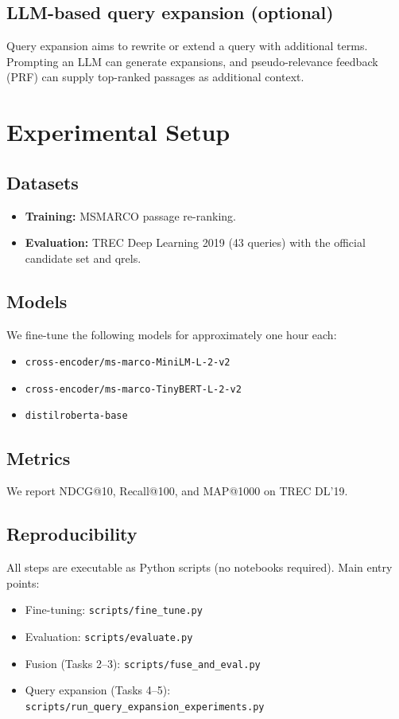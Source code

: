 \documentclass[11pt]{article}
\begin{document}
\subsection{LLM-based query expansion (optional)}
Query expansion aims to rewrite or extend a query with additional terms. Prompting an LLM can generate expansions, and pseudo-relevance feedback (PRF) can supply top-ranked passages as additional context.

\section{Experimental Setup}
\subsection{Datasets}
\begin{itemize}[leftmargin=*]
  \item \textbf{Training:} MSMARCO passage re-ranking.
  \item \textbf{Evaluation:} TREC Deep Learning 2019 (43 queries) with the official candidate set and qrels.
\end{itemize}

\subsection{Models}
We fine-tune the following models for approximately one hour each:
\begin{itemize}[leftmargin=*]
  \item \texttt{cross-encoder/ms-marco-MiniLM-L-2-v2}
  \item \texttt{cross-encoder/ms-marco-TinyBERT-L-2-v2}
  \item \texttt{distilroberta-base}
\end{itemize}

\subsection{Metrics}
We report NDCG@10, Recall@100, and MAP@1000 on TREC DL'19.

\subsection{Reproducibility}
All steps are executable as Python scripts (no notebooks required). Main entry points:
\begin{itemize}[leftmargin=*]
  \item Fine-tuning: \texttt{scripts/fine\_tune.py}
  \item Evaluation: \texttt{scripts/evaluate.py}
  \item Fusion (Tasks 2--3): \texttt{scripts/fuse\_and\_eval.py}
  \item Query expansion (Tasks 4--5): \texttt{scripts/run\_query\_expansion\_experiments.py}
\end{itemize}
\end{document}
